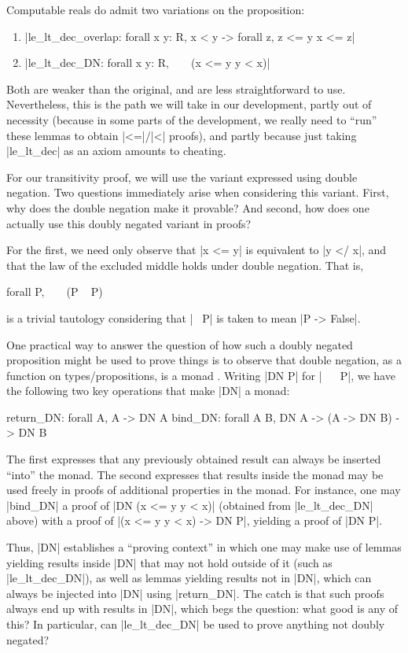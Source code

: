 \documentclass[runningheads]{llncs}
\begin{document}
Computable reals do admit two variations on the proposition:
\begin{enumerate}
\item |le_lt_dec_overlap: forall x y: R, x < y -> forall z, z <= y \/ x <= z|
\item |le_lt_dec_DN: forall x y: R, ~ ~ (x <= y \/ y < x)|
\end{enumerate}

Both are weaker than the original, and are less straightforward to use. Nevertheless, this is the path we will take in our development, partly out of necessity (because in some parts of the development, we really need to ``run'' these lemmas to obtain |<=|/|<| proofs), and partly because just taking |le_lt_dec| as an axiom amounts to cheating.

For our transitivity proof, we will use the variant expressed using double negation. Two questions immediately arise when considering this variant. First, why does the double negation make it provable? And second, how does one actually use this doubly negated variant in proofs?

For the first, we need only observe that |x <= y| is equivalent to |y </ x|, and that the law of the excluded middle holds under double negation. That is,
\begin{code}
  forall P, ~ ~ (P \/ ~ P)
\end{code}
is a trivial tautology considering that |~ P| is taken to mean |P -> False|.

One practical way to answer the question of how such a doubly negated proposition might be used to prove things is to observe that double negation, as a function on types/propositions, is a monad \cite{bla}. Writing |DN P| for |~ ~ P|, we have the following two key operations that make |DN| a monad:


\begin{code}
  return_DN: forall A, A -> DN A
  bind_DN: forall A B, DN A -> (A -> DN B) -> DN B
\end{code}
The first expresses that any previously obtained result can always be inserted ``into'' the monad. The second expresses that results inside the monad may be used freely in proofs of additional properties in the monad. For instance, one may |bind_DN| a proof of |DN (x <= y \/ y < x)| (obtained from |le_lt_dec_DN| above) with a proof of |(x <= y \/ y < x) -> DN P|, yielding a proof of |DN P|.

Thus, |DN| establishes a ``proving context'' in which one may make use of lemmas yielding results inside |DN| that may not hold outside of it (such as |le_lt_dec_DN|), as well as lemmas yielding results not in |DN|, which can always be injected into |DN| using |return_DN|. The catch is that such proofs always end up with results in |DN|, which begs the question: what good is any of this? In particular, can |le_lt_dec_DN| be used to prove anything not doubly negated?
\end{document}
